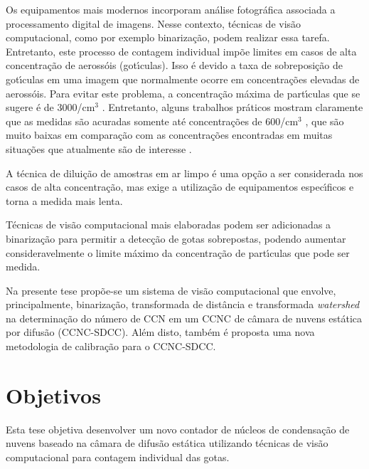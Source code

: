 Os equipamentos mais modernos incorporam an\'{a}lise fotogr\'{a}fica associada a processamento digital de imagens.
Nesse contexto, t\'{e}cnicas de vis\~{a}o computacional, como por exemplo binariza\c{c}\~{a}o, podem realizar essa tarefa. Entretanto, este processo de contagem individual imp\~{o}e limites em casos de alta concentra\c{c}\~{a}o de aeross\'{o}is (got\'{\i}culas). Isso \'{e} devido a taxa de sobreposi\c{c}\~{a}o de got\'{\i}culas em uma imagem que normalmente ocorre em concentra\c{c}\~{o}es elevadas de aeross\'{o}is. Para evitar este problema, a concentra\c{c}\~{a}o m\'{a}xima de part\'{\i}culas que se sugere \'{e} de 3000/cm$^3$ \cite{Rose}. Entretanto, alguns trabalhos pr\'{a}ticos mostram claramente que as medidas s\~{a}o acuradas somente at\'{e} concentra\c{c}\~{o}es de 600/cm$^3$ \cite{Frank}, que s\~{a}o muito baixas em compara\c{c}\~{a}o com as concentra\c{c}\~{o}es encontradas em muitas situa\c{c}\~{o}es que atualmente s\~{a}o de interesse \cite{Andreae}.

A t\'{e}cnica de dilui\c{c}\~{a}o de amostras em ar limpo \'{e} uma op\c{c}\~{a}o a ser considerada nos casos de alta concentra\c{c}\~{a}o, mas exige a utiliza\c{c}\~{a}o de equipamentos espec\'{\i}ficos e torna a medida mais lenta.

T\'{e}cnicas de vis\~{a}o computacional mais elaboradas podem ser adicionadas a binariza\c{c}\~{a}o para permitir a detec\c{c}\~{a}o de gotas sobrepostas, podendo aumentar consideravelmente o limite m\'{a}ximo da concentra\c{c}\~{a}o de part\'{\i}culas que pode ser medida.

Na presente tese prop\~{o}e-se um sistema de vis\~{a}o computacional que envolve, principalmente, binariza\c{c}\~{a}o, transformada de dist\^{a}ncia e transformada \emph{watershed}  na determina\c{c}\~{a}o do n\'{u}mero de CCN em um CCNC de c\^{a}mara de nuvens est\'{a}tica por difus\~{a}o (CCNC-SDCC). Al\'{e}m disto, tamb\'{e}m \'{e} proposta uma nova metodologia de calibra\c{c}\~{a}o para o CCNC-SDCC.



\section{Objetivos}
\label{sec:objetivo}

Esta tese objetiva desenvolver um novo contador de n\'{u}cleos de condensa\c{c}\~{a}o de nuvens baseado na c\^{a}mara de difus\~{a}o est\'{a}tica utilizando t\'{e}cnicas de vis\~{a}o computacional para contagem individual das gotas.


